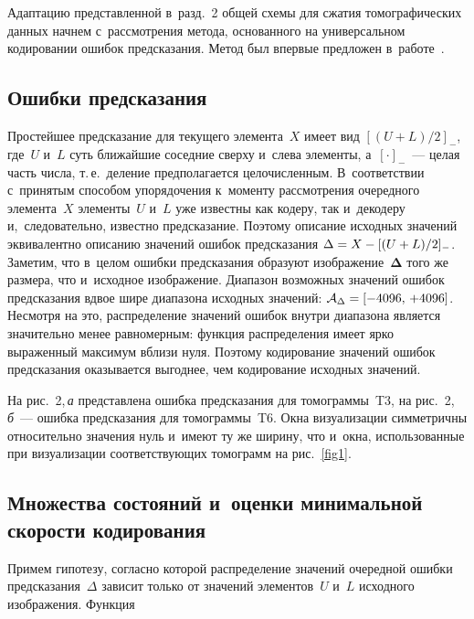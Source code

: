 \begin{multicols}{2}
Адаптацию представленной в~разд.~2 общей схемы для сжатия томографических 
данных начнем с~рассмотрения метода, основанного на универсальном кодировании 
ошибок предсказания. Метод был впервые предложен в~работе~\cite{b01}.

\vspace*{-6pt}

\subsection{Ошибки предсказания}

Простейшее предсказание для текущего элемента~$X$ имеет вид $[(U\!+\!L)/2]_{-}$, 
где~$U$
и~$L$ суть ближайшие соседние сверху и~слева элементы, а~$[\cdot]_{-}$~--- 
целая часть числа, т.\,е.\ деление предполагается целочис\-лен\-ным. 
В~соответствии с~принятым способом упорядочения к~моменту рассмотрения очередного 
элемента~$X$ элементы~$U$ и~$L$ уже известны как кодеру, так и~декодеру 
и,~следовательно, известно предсказание. Поэтому описание исходных значений 
эквивалентно описанию значений ошибок предсказания $\Delta\hm=X\hm-[(U\hm+L)/2]_{-}$. 
Заметим, что в~целом ошибки предсказания образуют изображение~$\boldsymbol{\Delta}$ 
того же размера, что и~исходное изображение. Диапазон возможных значений ошибок 
предсказания вдвое шире диапазона исходных значений: ${\cal A}_{\Delta}\hm=
[-4096,\,+4096]$. Несмотря на это, распределение значений ошибок внутри 
диапазона является значительно менее равномерным: функция распределения имеет 
ярко выраженный максимум вблизи нуля. Поэтому кодирование значений ошибок предсказания 
оказывается выгоднее, чем кодирование исходных значений.

На рис.~2,\,\textit{а} представлена ошибка предсказания для томограммы~T3, 
на рис.~2,\,\textit{б}~--- 
ошибка предсказания для томограммы~T6. Окна визуализации симметричны относительно 
значения нуль и~имеют ту же ширину, что и~окна, использованные при визуализации 
соответствующих томограмм на рис.~\ref{fig1}.

\vspace*{-6pt}


\subsection{Множества состояний и~оценки минимальной скорости кодирования}

Примем гипотезу, согласно которой распределение значений очередной ошибки 
предсказания~$\Delta$ зависит только от значений элементов~$U$ и~$L$ исходного 
изображения. Функция


\end{multicols}
